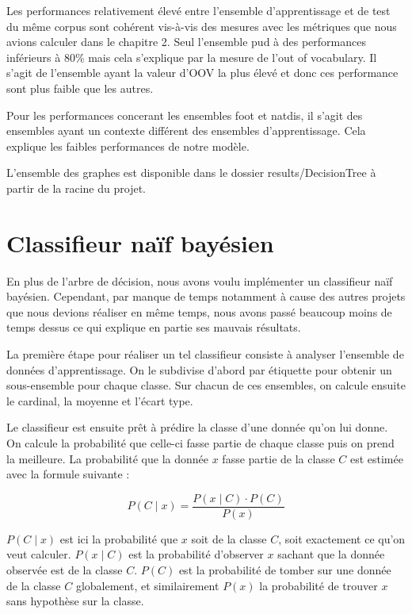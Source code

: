 \documentclass[french, 14pt]{memoir}
\begin{document}
Les performances relativement élevé entre l'ensemble d'apprentissage et de test du même corpus sont cohérent vis-à-vis des mesures avec les métriques que nous avions calculer dans le chapitre 2. Seul l'ensemble pud à des performances inférieurs à 80\% mais cela s'explique par la mesure de l'out of vocabulary. Il s'agit de l'ensemble ayant la valeur d'OOV la plus élevé et donc ces performance sont plus faible que les autres.

Pour les performances concerant les ensembles foot et natdis, il s'agit des ensembles ayant un contexte différent des ensembles d'apprentissage. Cela explique les faibles performances de notre modèle. 

L'ensemble des graphes est disponible dans le dossier results/DecisionTree à partir de la racine du projet.

\section{Classifieur naïf bayésien}

En plus de l'arbre de décision, nous avons voulu implémenter un classifieur naïf bayésien. Cependant, par manque de temps notamment à cause des autres projets que nous devions réaliser en même temps, nous avons passé beaucoup moins de temps dessus ce qui explique en partie ses mauvais résultats.

La première étape pour réaliser un tel classifieur consiste à analyser l'ensemble de données d'apprentissage. On le subdivise d'abord par étiquette pour obtenir un sous-ensemble pour chaque classe. Sur chacun de ces ensembles, on calcule ensuite le cardinal, la moyenne et l'écart type.

Le classifieur est ensuite prêt à prédire la classe d'une donnée qu'on lui donne. On calcule la probabilité que celle-ci fasse partie de chaque classe puis on prend la meilleure. La probabilité que la donnée $x$ fasse partie de la classe $C$ est estimée avec la formule suivante :

\begin{equation}
P(C \mid x) = \frac{P(x \mid C) \cdot P(C)}{P(x)}
\end{equation}

$P(C \mid x)$ est ici la probabilité que $x$ soit de la classe $C$, soit exactement ce qu'on veut calculer. $P(x \mid C)$ est la probabilité d'observer $x$ sachant que la donnée observée est de la classe $C$. $P(C)$ est la probabilité de tomber sur une donnée de la classe $C$ globalement, et similairement $P(x)$ la probabilité de trouver $x$ sans hypothèse sur la classe.
\end{document}
